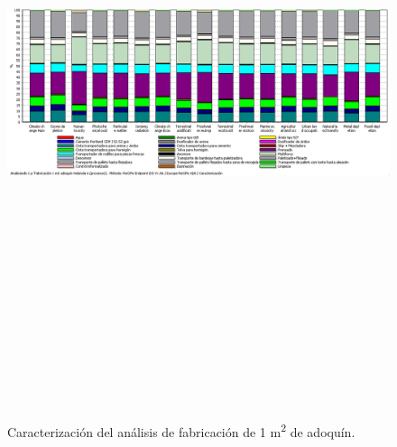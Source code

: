 \begin{figure}[!htb]
\centering
\includegraphics[angle=90,height=19cm]{img/fabricacion_caracterizacion.png}
\caption{Caracterización del análisis de fabricación de 1 \si{m^2} de adoquín.}
\label{fig:caracterizacionfabricacion}
\end{figure}

